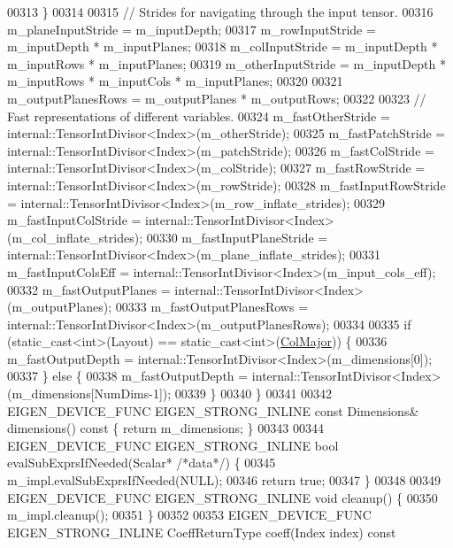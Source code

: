 \begin{DoxyCode}
00313     \}
00314 
00315     \textcolor{comment}{// Strides for navigating through the input tensor.}
00316     m\_planeInputStride = m\_inputDepth;
00317     m\_rowInputStride = m\_inputDepth * m\_inputPlanes;
00318     m\_colInputStride = m\_inputDepth * m\_inputRows * m\_inputPlanes;
00319     m\_otherInputStride = m\_inputDepth * m\_inputRows * m\_inputCols * m\_inputPlanes;
00320 
00321     m\_outputPlanesRows = m\_outputPlanes * m\_outputRows;
00322 
00323     \textcolor{comment}{// Fast representations of different variables.}
00324     m\_fastOtherStride = internal::TensorIntDivisor<Index>(m\_otherStride);
00325     m\_fastPatchStride = internal::TensorIntDivisor<Index>(m\_patchStride);
00326     m\_fastColStride = internal::TensorIntDivisor<Index>(m\_colStride);
00327     m\_fastRowStride = internal::TensorIntDivisor<Index>(m\_rowStride);
00328     m\_fastInputRowStride = internal::TensorIntDivisor<Index>(m\_row\_inflate\_strides);
00329     m\_fastInputColStride = internal::TensorIntDivisor<Index>(m\_col\_inflate\_strides);
00330     m\_fastInputPlaneStride = internal::TensorIntDivisor<Index>(m\_plane\_inflate\_strides);
00331     m\_fastInputColsEff = internal::TensorIntDivisor<Index>(m\_input\_cols\_eff);
00332     m\_fastOutputPlanes = internal::TensorIntDivisor<Index>(m\_outputPlanes);
00333     m\_fastOutputPlanesRows = internal::TensorIntDivisor<Index>(m\_outputPlanesRows);
00334 
00335     \textcolor{keywordflow}{if} (static\_cast<int>(Layout) == \textcolor{keyword}{static\_cast<}\textcolor{keywordtype}{int}\textcolor{keyword}{>}(\hyperlink{group__enums_ggaacded1a18ae58b0f554751f6cdf9eb13a0cbd4bdd0abcfc0224c5fcb5e4f6669a}{ColMajor})) \{
00336       m\_fastOutputDepth = internal::TensorIntDivisor<Index>(m\_dimensions[0]);
00337     \} \textcolor{keywordflow}{else} \{
00338       m\_fastOutputDepth = internal::TensorIntDivisor<Index>(m\_dimensions[NumDims-1]);
00339     \}
00340   \}
00341 
00342   EIGEN\_DEVICE\_FUNC EIGEN\_STRONG\_INLINE \textcolor{keyword}{const} Dimensions& dimensions()\textcolor{keyword}{ const }\{ \textcolor{keywordflow}{return} m\_dimensions; \}
00343 
00344   EIGEN\_DEVICE\_FUNC EIGEN\_STRONG\_INLINE \textcolor{keywordtype}{bool} evalSubExprsIfNeeded(Scalar* \textcolor{comment}{/*data*/}) \{
00345     m\_impl.evalSubExprsIfNeeded(NULL);
00346     \textcolor{keywordflow}{return} \textcolor{keyword}{true};
00347   \}
00348 
00349   EIGEN\_DEVICE\_FUNC EIGEN\_STRONG\_INLINE \textcolor{keywordtype}{void} cleanup() \{
00350     m\_impl.cleanup();
00351   \}
00352 
00353   EIGEN\_DEVICE\_FUNC EIGEN\_STRONG\_INLINE CoeffReturnType coeff(Index index)\textcolor{keyword}{ const}

\end{DoxyCode}
